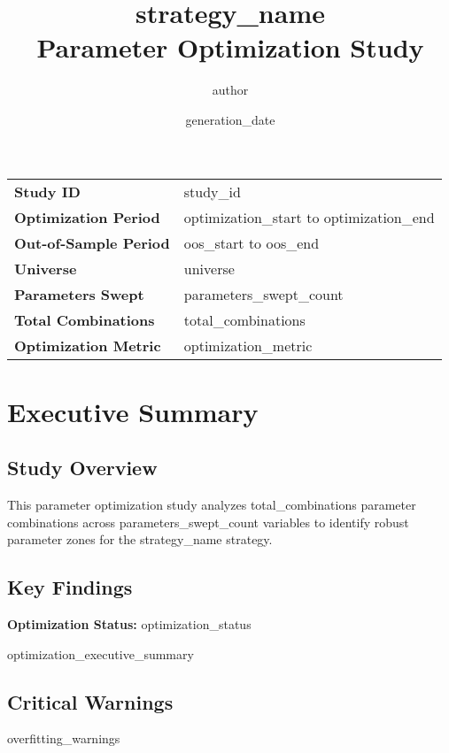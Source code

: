\documentclass[11pt,a4paper]{article}
\title{\textbf{{{strategy_name}}}\\[0.5em]\Large Parameter Optimization Study}
\author{{{author}}}
\date{{{generation_date}}}
\begin{document}
\maketitle
\thispagestyle{empty}

\vspace{1em}
\begin{center}
\begin{tabular}{|l|l|}
\hline
\textbf{Study ID} & {{study_id}} \\
\textbf{Optimization Period} & {{optimization_start}} to {{optimization_end}} \\
\textbf{Out-of-Sample Period} & {{oos_start}} to {{oos_end}} \\
\textbf{Universe} & {{universe}} \\
\textbf{Parameters Swept} & {{parameters_swept_count}} \\
\textbf{Total Combinations} & {{total_combinations}} \\
\textbf{Optimization Metric} & {{optimization_metric}} \\
\hline
\end{tabular}
\end{center}

\newpage

\section{Executive Summary}

\subsection{Study Overview}
This parameter optimization study analyzes {{total_combinations}} parameter combinations across {{parameters_swept_count}} variables to identify robust parameter zones for the {{strategy_name}} strategy.

\subsection{Key Findings}
\textbf{Optimization Status:} {{optimization_status}}

{{optimization_executive_summary}}

\subsection{Critical Warnings}
\begin{itemize}
{{overfitting_warnings}}
\end{itemize}
\end{document}
